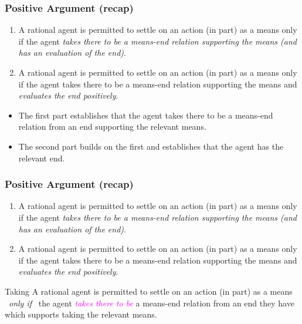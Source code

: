 \documentclass[noamssymb,
]{beamer} %
\newcommand{\hozlinedash}[0]{
  \noindent\hdashrule[0.5ex][c]{\textwidth}{.1pt}{2.5pt}
}
\begin{document}
\begin{frame}
  \frametitle{Positive Argument (recap)}

  \begin{enumerate}
  \item A rational agent is permitted to settle on an action (in part) as a means only if the agent \emph{takes there to be a means-end relation supporting the means (and has an evaluation of the end)}.
  \item A rational agent is permitted to settle on an action (in part) as a means only if the agent takes there to be a means-end relation supporting the means and \emph{evaluates the end positively}.
  \end{enumerate}

  \begin{itemize}
  \item The first part establishes that the agent takes there to be a means-end relation from an end supporting the relevant means.
  \item The second part builds on the first and establishes that the agent has the relevant end.
  \end{itemize}

\end{frame}


\begin{frame}
  \frametitle{Positive Argument (recap)}

  \begin{enumerate}
  \item A rational agent is permitted to settle on an action (in part) as a means only if the agent \emph{takes there to be a means-end relation supporting the means (and has an evaluation of the end)}.
  \item A rational agent is permitted to settle on an action (in part) as a means only if the agent takes there to be a means-end relation supporting the means and \emph{evaluates the end positively}.
  \end{enumerate}

  \hozlinedash
  {\footnotesize
  \begin{block}{Taking}
    A rational agent is permitted to settle on an action (in part) as a means
    \newline
    \mbox{ }\hfill\emph{only if}\hfill\mbox{ }
    \newline
    the agent \textcolor{fuchsia}{\emph{takes there to be}}  a means-end relation from an end they have which supports taking the relevant means.
  \end{block}
  }
\end{frame}
\end{document}
